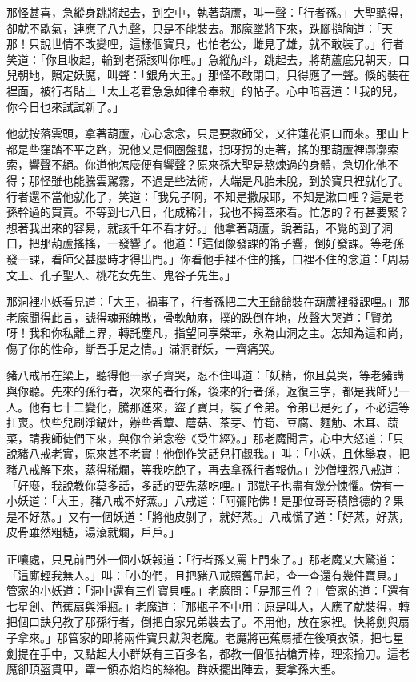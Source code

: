 那怪甚喜，急縱身跳將起去，到空中，執著葫蘆，叫一聲：「行者孫。」大聖聽得，卻就不歇氣，連應了八九聲，只是不能裝去。那魔墜將下來，跌腳搥胸道：「天那！只說世情不改變哩，這樣個寶貝，也怕老公，雌見了雄，就不敢裝了。」行者笑道：「你且收起，輪到老孫該叫你哩。」急縱觔斗，跳起去，將葫蘆底兒朝天，口兒朝地，照定妖魔，叫聲：「銀角大王。」那怪不敢閉口，只得應了一聲。倏的裝在裡面，被行者貼上「太上老君急急如律令奉敕」的帖子。心中暗喜道：「我的兒，你今日也來試試新了。」

他就按落雲頭，拿著葫蘆，心心念念，只是要救師父，又往蓮花洞口而來。那山上都是些窪踏不平之路，況他又是個圈盤腿，拐呀拐的走著，搖的那葫蘆裡漷漷索索，響聲不絕。你道他怎麼便有響聲？原來孫大聖是熬煉過的身體，急切化他不得；那怪雖也能騰雲駕霧，不過是些法術，大端是凡胎未脫，到於寶貝裡就化了。行者還不當他就化了，笑道：「我兒子啊，不知是撒尿耶，不知是漱口哩？這是老孫幹過的買賣。不等到七八日，化成稀汁，我也不揭蓋來看。忙怎的？有甚要緊？想著我出來的容易，就該千年不看才好。」他拿著葫蘆，說著話，不覺的到了洞口，把那葫蘆搖搖，一發響了。他道：「這個像發課的筩子響，倒好發課。等老孫發一課，看師父甚麼時才得出門。」你看他手裡不住的搖，口裡不住的念道：「周易文王、孔子聖人、桃花女先生、鬼谷子先生。」

那洞裡小妖看見道：「大王，禍事了，行者孫把二大王爺爺裝在葫蘆裡發課哩。」那老魔聞得此言，諕得魂飛魄散，骨軟觔麻，撲的跌倒在地，放聲大哭道：「賢弟呀！我和你私離上界，轉託塵凡，指望同享榮華，永為山洞之主。怎知為這和尚，傷了你的性命，斷吾手足之情。」滿洞群妖，一齊痛哭。

豬八戒吊在梁上，聽得他一家子齊哭，忍不住叫道：「妖精，你且莫哭，等老豬講與你聽。先來的孫行者，次來的者行孫，後來的行者孫，返復三字，都是我師兄一人。他有七十二變化，騰那進來，盜了寶貝，裝了令弟。令弟已是死了，不必這等扛喪。快些兒刷淨鍋灶，辦些香蕈、蘑菇、茶芽、竹筍、豆腐、麵觔、木耳、蔬菜，請我師徒們下來，與你令弟念卷《受生經》。」那老魔聞言，心中大怒道：「只說豬八戒老實，原來甚不老實！他倒作笑話兒打覷我。」叫：「小妖，且休舉哀，把豬八戒解下來，蒸得稀爛，等我吃飽了，再去拿孫行者報仇。」沙僧埋怨八戒道：「好麼，我說教你莫多話，多話的要先蒸吃哩。」那獃子也盡有幾分悚懼。傍有一小妖道：「大王，豬八戒不好蒸。」八戒道：「阿彌陀佛！是那位哥哥積陰德的？果是不好蒸。」又有一個妖道：「將他皮剝了，就好蒸。」八戒慌了道：「好蒸，好蒸，皮骨雖然粗糙，湯滾就爛，戶戶。」

正嚷處，只見前門外一個小妖報道：「行者孫又罵上門來了。」那老魔又大驚道：「這廝輕我無人。」叫：「小的們，且把豬八戒照舊吊起，查一查還有幾件寶貝。」管家的小妖道：「洞中還有三件寶貝哩。」老魔問：「是那三件？」管家的道：「還有七星劍、芭蕉扇與淨瓶。」老魔道：「那瓶子不中用：原是叫人，人應了就裝得，轉把個口訣兒教了那孫行者，倒把自家兄弟裝去了。不用他，放在家裡。快將劍與扇子拿來。」那管家的即將兩件寶貝獻與老魔。老魔將芭蕉扇插在後項衣領，把七星劍提在手中，又點起大小群妖有三百多名，都教一個個拈槍弄棒，理索掄刀。這老魔卻頂盔貫甲，罩一領赤焰焰的絲袍。群妖擺出陣去，要拿孫大聖。

